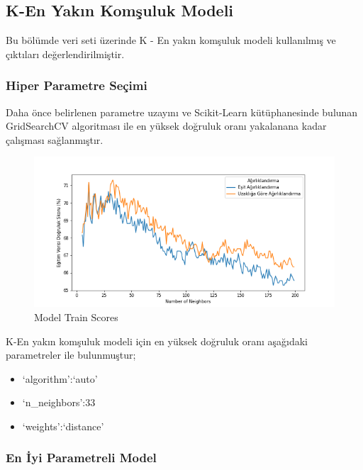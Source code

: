 \documentclass[12pt,twoside]{deuthesis}
\providecommand{\tightlist}{%
  \setlength{\itemsep}{0pt}\setlength{\parskip}{0pt}}
\begin{document}
\hypertarget{mult_knn}{%
\subsection{K-En Yakın Komşuluk Modeli}\label{mult_knn}}

Bu bölümde veri seti üzerinde K - En yakın komşuluk modeli kullanılmış ve çıktıları değerlendirilmiştir.

\hypertarget{hiper-parametre-seuxe7imi}{%
\subsubsection{Hiper Parametre Seçimi}\label{hiper-parametre-seuxe7imi}}

Daha önce belirlenen parametre uzayını ve Scikit-Learn kütüphanesinde bulunan GridSearchCV algoritması ile en yüksek doğruluk oranı yakalanana kadar çalışması sağlanmıştır.
\begin{figure}

{\centering \includegraphics[width=1.1\linewidth,height=0.55\textheight]{figure/KNN_Grid_Graph} 

}

\caption{Model Train Scores}\label{fig:unnamed-chunk-14}
\end{figure}
K-En yakın komşuluk modeli için en yüksek doğruluk oranı aşağıdaki parametreler ile bulunmuştur;
\begin{itemize}
\tightlist
\item
  `algorithm':`auto'
\item
  `n\_neighbors':33
\item
  `weights':`distance'
\end{itemize}
\newpage

\hypertarget{en-iyi-parametreli-model}{%
\subsubsection{En İyi Parametreli Model}\label{en-iyi-parametreli-model}}
\end{document}

